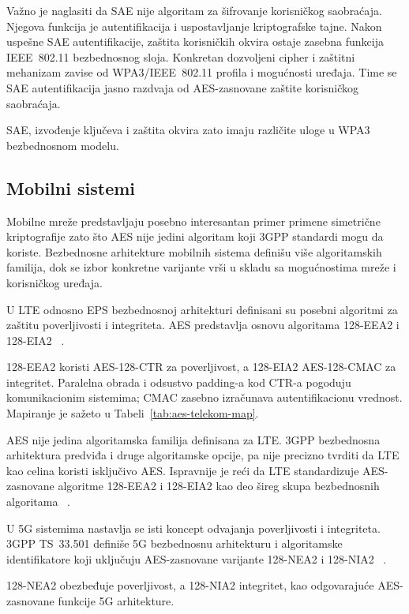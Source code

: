 Važno je naglasiti da SAE nije algoritam za šifrovanje korisničkog
saobraćaja. Njegova funkcija je autentifikacija i uspostavljanje
kriptografske tajne. Nakon uspešne SAE autentifikacije, zaštita korisničkih okvira
ostaje zasebna funkcija IEEE~802.11 bezbednosnog sloja. Konkretan
dozvoljeni cipher i zaštitni mehanizam zavise od WPA3/IEEE~802.11
profila i mogućnosti uređaja. Time se SAE autentifikacija jasno
razdvaja od AES-zasnovane zaštite korisničkog saobraćaja.

SAE, izvođenje ključeva i zaštita okvira zato imaju različite uloge u
WPA3 bezbednosnom modelu.

\subsection{Mobilni sistemi}
\label{subsec:mobilni}

Mobilne mreže predstavljaju posebno interesantan primer primene
simetrične kriptografije zato što AES nije jedini algoritam koji
3GPP standardi mogu da koriste. Bezbednosne arhitekture mobilnih
sistema definišu više algoritamskih familija, dok se izbor konkretne
varijante vrši u skladu sa mogućnostima mreže i korisničkog uređaja.

U LTE odnosno EPS bezbednosnoj arhitekturi definisani su posebni
algoritmi za zaštitu poverljivosti i integriteta. AES predstavlja
osnovu algoritama 128-EEA2 i 128-EIA2
~\cite{3gpp-33401}.

128-EEA2 koristi AES-128-CTR za poverljivost, a 128-EIA2 AES-128-CMAC
za integritet. Paralelna obrada i odsustvo padding-a kod CTR-a pogoduju
komunikacionim sistemima; CMAC zasebno izračunava autentifikacionu
vrednost. Mapiranje je sažeto u Tabeli~\ref{tab:aes-telekom-map}.

AES nije jedina algoritamska familija definisana za LTE. 3GPP
bezbednosna arhitektura predviđa i druge algoritamske opcije, pa nije
precizno tvrditi da LTE kao celina koristi isključivo AES.
Ispravnije je reći da LTE standardizuje AES-zasnovane algoritme
128-EEA2 i 128-EIA2 kao deo šireg skupa bezbednosnih algoritama
~\cite{3gpp-33401}.

U 5G sistemima nastavlja se isti koncept odvajanja poverljivosti i
integriteta. 3GPP TS~33.501 definiše 5G bezbednosnu arhitekturu i
algoritamske identifikatore koji uključuju AES-zasnovane varijante
128-NEA2 i 128-NIA2
~\cite{3gpp-33501}.

128-NEA2 obezbeđuje poverljivost, a 128-NIA2 integritet, kao
odgovarajuće AES-zasnovane funkcije 5G arhitekture.

